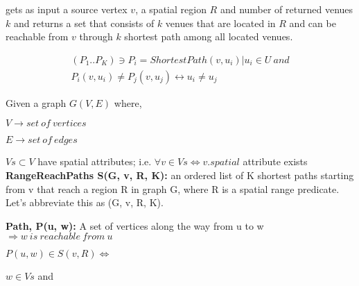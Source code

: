 {\query} gets as input a source vertex $v$, a spatial region $R$ and number of returned venues $k$ and returns a set that consists of $k$ venues that are located in $R$ and can be reachable from $v$ through $k$ shortest path among all located venues.

\iffalse
\begin{eqnarray*}
  	(P_1..P_K) \ni P_i = ShortestPath(v, u_i) | u_i \in U\ and\\
  	P_i(v, u_i) \neq P_j(v, u_j) \leftrightarrow u_i \neq u_j
\end{eqnarray*}


Given a graph $G(V, E)$ where,

\quad$V \rightarrow set\ of\ vertices$

\quad$E \rightarrow set\ of\ edges$

$Vs \subset V$ have spatial attributes; i.e. $\forall v \in Vs \Leftrightarrow v.spatial$ attribute exists\\


\textbf{RangeReachPaths S(G, v, R, K):} an ordered list of K shortest paths starting from v that reach a region R in graph G, where R is a spatial range predicate. Let's abbreviate this as {\rrp}(G, v, R, K).

\textbf{Path, P(u, w):} A set of vertices along the way from u to w \(\Rightarrow w\ is\ reachable\ from\ u\)

\quad${P(u, w) \in S(v, R) \Leftrightarrow}$

\quad{}

\quad\quad${w \in Vs}$ and

